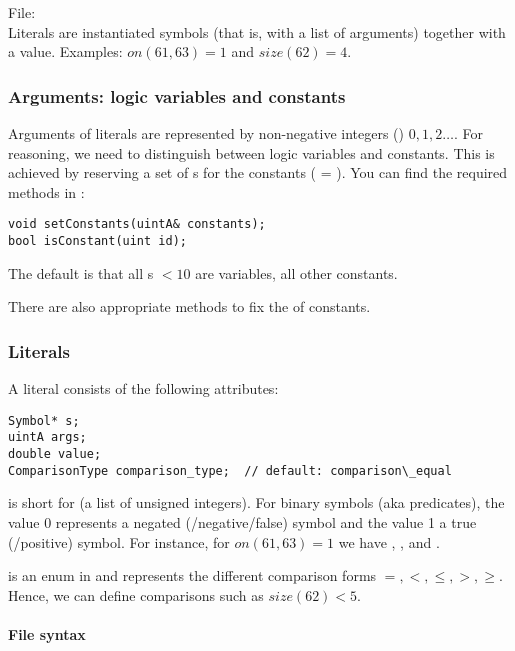 \documentclass[10pt,twoside,twocolumn,fleqn]{article}
\begin{document}
File: \\


Literals are instantiated symbols (that is, with a list of arguments)
together with a value. Examples: $on(61,63)=1$ and $size(62)=4$.


\subsubsection{Arguments: logic variables and constants}
\label{sec:literals:arguments}

Arguments of literals are represented by non-negative integers
() $0,1,2 \dots$. For reasoning, we need to distinguish between
logic variables and constants. This is achieved by reserving a set of
s for the constants ( = ).
You can find the required methods in :
\begin{lstlisting}
void setConstants(uintA& constants);
bool isConstant(uint id);
\end{lstlisting}
The default is that all s $<10$ are variables, all other
constants.

There are also appropriate methods to fix the  of
constants.


\subsubsection{Literals}

A literal consists of the following attributes:
\begin{lstlisting}
Symbol* s;
uintA args;
double value;
ComparisonType comparison_type;  // default: comparison\_equal
\end{lstlisting}
 is short for  (a list of unsigned
integers). For binary symbols (aka predicates), the value 0 represents a
negated (/negative/false) symbol and the value 1 a true (/positive) symbol.
For instance, for $on(61,63)=1$ we have ,
,  and .

 is an enum in  and represents
the different comparison forms $=, <, \le, >, \ge$. Hence, we can define
comparisons such as $size(62)<5$.




\paragraph{File syntax}
\end{document}
